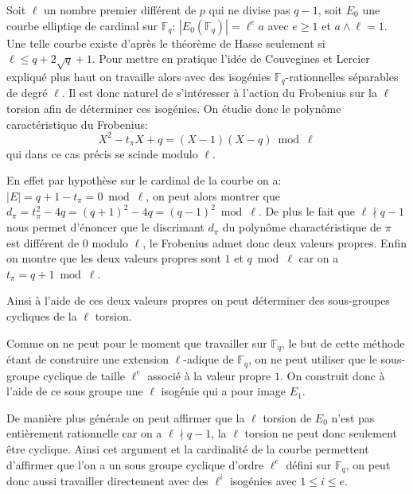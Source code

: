 \documentclass[10pt,a4paper]{book}
\theoremstyle{plain}
\theoremstyle{definition}
\theoremstyle{definition}
\theoremstyle{definition}
\theoremstyle{definition}
\theoremstyle{remark}
\theoremstyle{remark}
\theoremstyle{definition}
\begin{document}
Soit $\ell$ un nombre premier différent de $p$ qui ne divise pas $q-1$, soit $E_0$ une courbe elliptiqe de cardinal sur $\mathbb{F}_q$: $|E_0(\mathbb{F}_q)|=\ell^e a$ avec $e \geqslant 1$ et $a \wedge \ell =1$. Une telle courbe existe d'après le théorème de Hasse seulement si $\ell \leqslant q+2\sqrt{q} +1$.  
Pour mettre en pratique l'idée de Couvegines et Lercier \cite{couveignesLercier2013} expliqué plus haut on travaille alors avec des isogénies $\mathbb{F}_q$-rationnelles séparables de degré $\ell$. Il est donc naturel de s'intéresser à l'action du Frobenius sur la $\ell$ torsion afin de déterminer ces isogénies. On étudie donc le polynôme caractéristique du Frobenius:
\begin{equation*}
X^2-t_{\pi}X+q=(X-1)(X-q) \bmod \ell
\end{equation*}
qui dans ce cas précis se scinde modulo $\ell$.


En effet par hypothèse sur le cardinal de la courbe on a: $|E|=q+1-t_{\pi}=0 \bmod \ell$, on peut alors montrer que $d_{\pi}=t_{\pi}^2-4q=(q+1)^2-4q=(q-1)^2 \bmod \ell$. De plus le fait que $\ell \nmid q-1$ nous permet d'énoncer que le discrimant $d_{\pi}$ du polynôme charactéristique de $\pi$ est différent de $0$ modulo $\ell$, le Frobenius admet donc deux valeurs propres. Enfin on montre que les deux valeurs propres sont $1$ et $q \bmod \ell$ car on a $t_{\pi}=q+1 \bmod \ell$.

Ainsi à l'aide de ces deux valeurs propres on peut déterminer des sous-groupes cycliques de la $\ell$ torsion. 

Comme on ne peut pour le moment que travailler sur $\mathbb{F}_q$, le but de cette méthode étant de construire une extension $\ell$-adique de $\mathbb{F}_q$, on ne peut utiliser que le sous-groupe cyclique de taille $\ell^e$ associé à la valeur propre $1$. On construit donc à l'aide de ce sous groupe une $\ell$ isogénie qui a pour image $E_1$. 

De manière plus générale  on peut affirmer que la $\ell$ torsion de $E_0$ n'est pas entièrement rationnelle car on a $\ell \nmid q-1$, la $\ell$ torsion ne peut donc seulement être cyclique. Ainsi cet argument et la cardinalité de la courbe permettent d'affirmer que l'on a un sous groupe cyclique d'ordre $\ell^e$ défini sur $\mathbb{F}_q$, on peut donc aussi travailler directement avec des $\ell^i$ isogénies avec $1 \leqslant i \leqslant e$.
\end{document}
